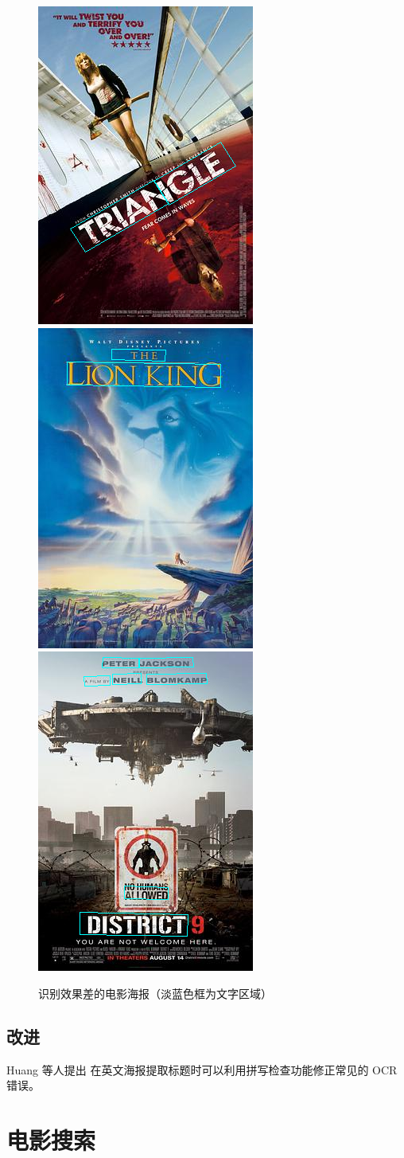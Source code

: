 \documentclass[main.tex]{subfiles}
\begin{document}
\begin{figure}
    \centering
    \includegraphics[width=0.3\linewidth]{images/poster_bad_1.png}
    \includegraphics[width=0.3\linewidth]{images/poster_bad_2.png}
    \includegraphics[width=0.3\linewidth]{images/poster_bad_3.png}
    \caption{识别效果差的电影海报（淡蓝色框为文字区域）}
    \label{fig:poster-bad-for-ocr}
\end{figure}

\subsection{改进}

Huang 等人提出 \cite{huang2015text} 在英文海报提取标题时可以利用拼写检查功能修正常见的 OCR 错误。

\section{电影搜索}
\end{document}
